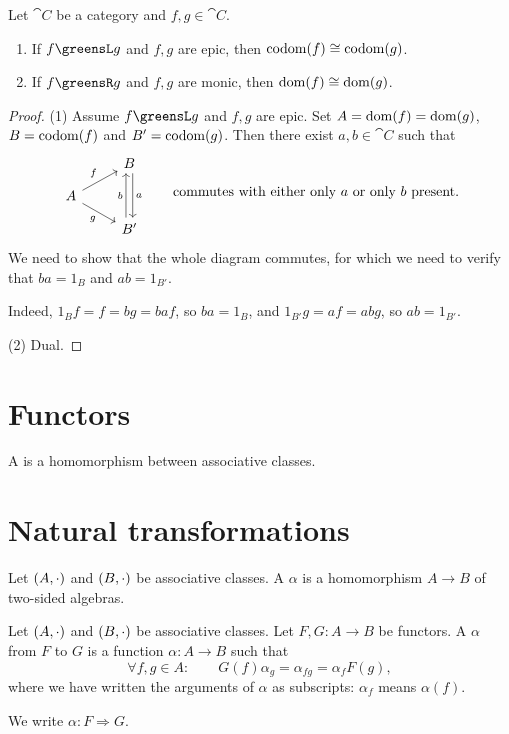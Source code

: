 \begin{lemma} \label{leftRightRelatedIsomorphic}
Let $\cat{C}$ be a category and $f,g\in \cat{C}$.
\begin{enumerate}
\item If $f \greensL g$ and $f,g$ are epic, then $\operatorname{codom}(f) \cong \operatorname{codom}(g)$.
\item If $f \greensR g$ and $f,g$ are monic, then $\operatorname{dom}(f) \cong \operatorname{dom}(g)$.
\end{enumerate}
\end{lemma}
\begin{proof}
(1) Assume $f \greensL g$ and $f,g$ are epic. Set $A = \operatorname{dom}(f) = \operatorname{dom}(g)$, $B=\operatorname{codom}(f)$ and $B'=\operatorname{codom}(g)$. Then there exist $a,b\in \cat{C}$ such that
\[ \begin{tikzcd}[row sep=small]
{} & B \arrow[dd, shift left, "a"] \\
A \arrow[ur, "f"] \arrow[dr, swap, "g"] & {} \\
{} & B' \arrow[uu, shift left, "b"]
\end{tikzcd} \qquad \text{commutes with either only $a$ or only $b$ present.} \]
We need to show that the whole diagram commutes, for which we need to verify that $ba = 1_B$ and $ab = 1_{B'}$.

Indeed, $1_{B}f = f = bg = baf$, so $ba = 1_B$, and $1_{B'}g = af = abg$, so $ab = 1_{B'}$.

(2) Dual.
\end{proof}

\section{Functors}
\begin{definition}
A  is a homomorphism between associative classes.
\end{definition}

\section{Natural transformations}
\begin{definition}
Let $\left( A,\cdot \right)$ and $\left( B,\cdot \right)$ be associative classes. A  $\alpha$ is a homomorphism $A\to B$ of two-sided algebras.
\end{definition}


\begin{definition}
Let $\left( A,\cdot \right)$ and $\left( B,\cdot \right)$ be associative classes. Let $F,G: A\to B$ be functors. A  $\alpha$ from $F$ to $G$ is a function $\alpha: A\to B$ such that
\[ \forall f,g\in A: \qquad G(f)\alpha_g = \alpha_{fg} = \alpha_f F(g), \]
where we have written the arguments of $\alpha$ as subscripts: $\alpha_f$ means $\alpha(f)$.

We write $\alpha: F \Rightarrow G$.
\end{definition}


